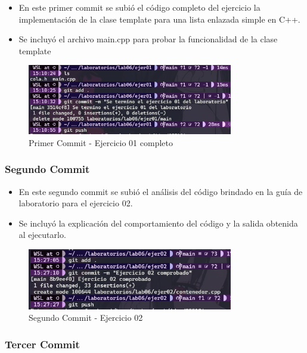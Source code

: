 \begin{itemize}
    \item En este primer commit se subió el código completo del ejercicio la implementación de la clase template para una lista enlazada simple en C++.
    \item Se incluyó el archivo main.cpp para probar la funcionalidad de la clase template
\end{itemize}

\begin{figure}[H]
    \centering
    \includegraphics[width=0.8\textwidth]{img/Commit01.png}
    \caption{Primer Commit - Ejercicio 01 completo}
    \label{fig:commit1}
\end{figure}


\subsubsection {Segundo Commit}

\begin{itemize}
    \item En este segundo commit se subió el análisis del código brindado en la guía de laboratorio para el ejercicio 02.
    \item Se incluyó la explicación del comportamiento del código y la salida obtenida al ejecutarlo.
\end{itemize}

\begin{figure}[H]
    \centering
    \includegraphics[width=0.8\textwidth]{img/Commit02.png}
    \caption{Segundo Commit - Ejercicio 02}
    \label{fig:commit2}
\end{figure}


\subsubsection {Tercer Commit}

